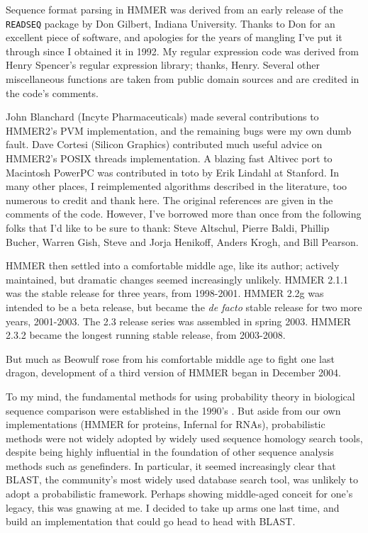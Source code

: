 Sequence format parsing in HMMER was derived from an early release of
the {\tt READSEQ} package by Don Gilbert, Indiana University. Thanks
to Don for an excellent piece of software, and apologies for the years
of mangling I've put it through since I obtained it in 1992. My
regular expression code was derived from Henry Spencer's regular
expression library; thanks, Henry. Several other miscellaneous
functions are taken from public domain sources and are credited in the
code's comments.

John Blanchard (Incyte Pharmaceuticals) made several contributions to
HMMER2's PVM implementation, and the remaining bugs were my own dumb
fault.  Dave Cortesi (Silicon Graphics) contributed much useful advice
on HMMER2's POSIX threads implementation. A blazing fast Altivec port
to Macintosh PowerPC was contributed in toto by Erik Lindahl at
Stanford. In many other places, I reimplemented algorithms described
in the literature, too numerous to credit and thank here. The original
references are given in the comments of the code. However, I've
borrowed more than once from the following folks that I'd like to be
sure to thank: Steve Altschul, Pierre Baldi, Phillip Bucher, Warren
Gish, Steve and Jorja Henikoff, Anders Krogh, and Bill Pearson.

HMMER then settled into a comfortable middle age, like its author;
actively maintained, but dramatic changes seemed increasingly
unlikely. HMMER 2.1.1 was the stable release for three years, from
1998-2001.  HMMER 2.2g was intended to be a beta release, but became
the \emph{de facto} stable release for two more years, 2001-2003. The
2.3 release series was assembled in spring 2003. HMMER 2.3.2 became
the longest running stable release, from 2003-2008.

But much as Beowulf rose from his comfortable middle age to fight one
last dragon, development of a third version of HMMER began in December
2004.

To my mind, the fundamental methods for using probability theory in
biological sequence comparison were established in the 1990's
\citep{Durbin98}. But aside from our own implementations (HMMER for
proteins, Infernal for RNAs), probabilistic methods were not widely
adopted by widely used sequence homology search tools, despite being
highly influential in the foundation of other sequence analysis
methods such as genefinders.  In particular, it seemed increasingly
clear that BLAST, the community's most widely used database search
tool, was unlikely to adopt a probabilistic framework. Perhaps showing
middle-aged conceit for one's legacy, this was gnawing at me. I
decided to take up arms one last time, and build an implementation
that could go head to head with BLAST.

